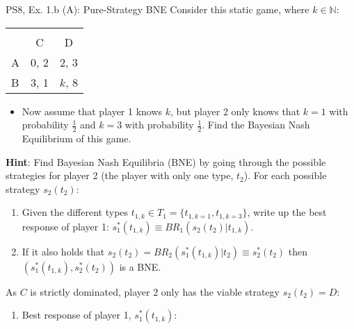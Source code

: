 \begin{frame}{PS8, Ex. 1.b (A): Pure-Strategy BNE}
    Consider this static game, where $k\in\mathbb{N}:$
    \vspace{-16pt}
    \begin{table}
      \begin{tabular}{l|c|c|}
        \multicolumn{1}{c}{} & \multicolumn{2}{c}{} \\
        \multicolumn{1}{c}{} & \multicolumn{1}{c}{C} & \multicolumn{1}{c}{D} \\\cline{2-3}
        A & 0, 2 & 2, 3 \\\cline{2-3}
        B & 3, 1 & $k$, 8 \\\cline{2-3}
      \end{tabular}
    \end{table}
    \vspace{-4pt}
    \begin{itemize}
      \item[(b)] Now assume that player 1 knows $k$, but player 2 only knows that $k = 1$ with probability $\frac{1}{2}$ and $k = 3$ with probability $\frac{1}{2}$. Find the Bayesian Nash Equilibrium of this game.
    \end{itemize}
    \vspace{-4pt}
    \begin{multicols}{2}
      \textbf{Hint}: Find Bayesian Nash Equilibria (BNE) by going through the possible strategies for player 2 (the player with only one type, $t_2$). For each possible strategy $s_2(t_2)$:
      \vspace{-4pt}
      \begin{enumerate}
        \item[Step 1:] Given the different types $t_{1,k}\in T_1=\{t_{1,k=1},t_{1,k=3}\}$, write up the best response of player 1: $s_1^*(t_{1,k})\equiv BR_1\left(s_2(t_2)|t_{1,k}\right)$.
        \item[Step 2:] If it also holds that $s_2(t_2)=BR_2\left(s_1^*(t_{1,k})|t_2\right)\equiv s_2^*(t_2)$ then $\left(s_1^*(t_{1,k}),s_2^*(t_2)\right)$ is a BNE.
      \end{enumerate}
      \vfill\null\columnbreak
      As $C$ is strictly dominated, player 2 only has the viable strategy $s_2(t_2)=D$:
      \begin{enumerate}\normalsize
        \item Best response of player 1, $s_1^*(t_{1,k}):$
      \end{enumerate}
      \vspace{-8pt}

\end{multicols}
\end{frame}
